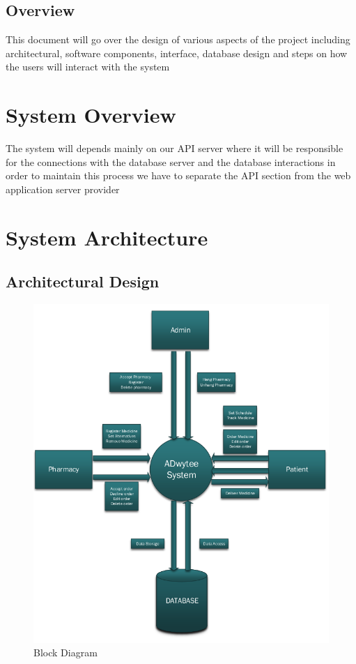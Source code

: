 \documentclass[]{article}
\begin{document}
\subsection{Overview}
This document will go over the design of various aspects of the project including architectural, software components, interface, database design and steps on how the users will interact with the system 


\section{System Overview}
The system will depends mainly on our API server where it will be responsible for the connections with the database server and the database interactions in order to maintain this process we have to separate the API section from the web application server provider   

\section{System Architecture}
\subsection{Architectural Design}

\begin{figure}[H]
\centering
\includegraphics[scale=0.4]{./block}
\caption{Block Diagram}
\end{figure}
\end{document}
